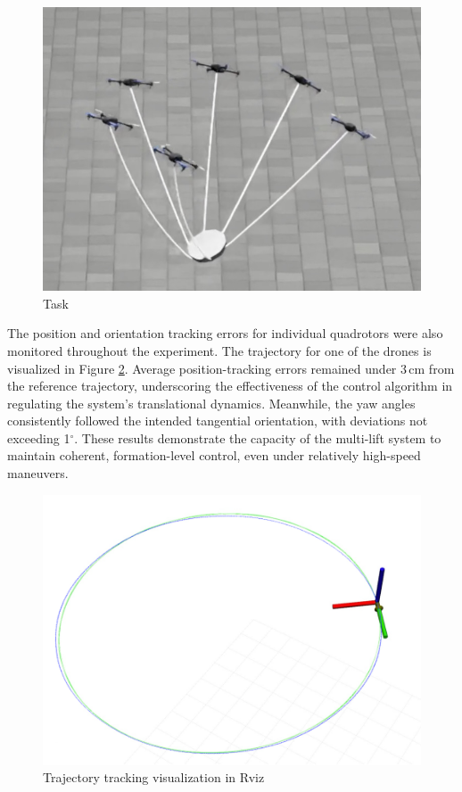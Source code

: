 \documentclass[12pt,twoside,letterpaper]{article}
\begin{document}
\begin{figure}[H]
\begin{minipage}{0.32\textwidth}
        \includegraphics[width=\linewidth]{figures/spin.jpg}
        \caption{Task}
        \label{fig:task}
    \end{minipage}
\end{figure}

The position and orientation tracking errors for individual quadrotors were also monitored throughout the experiment. The trajectory for one of the drones is visualized in Figure \ref{fig:track}. Average position-tracking errors remained under 3\,cm from the reference trajectory, underscoring the effectiveness of the control algorithm in regulating the system’s translational dynamics. Meanwhile, the yaw angles consistently followed the intended tangential orientation, with deviations not exceeding 1\(^\circ\). These results demonstrate the capacity of the multi-lift system to maintain coherent, formation-level control, even under relatively high-speed maneuvers.

\begin{figure}[H]
    \centering
    \begin{minipage}{\textwidth}
        \centering
        \includegraphics[width=0.45\linewidth]{figures/track.jpg}
        \caption{Trajectory tracking visualization in Rviz}
        \label{fig:track}
    \end{minipage}
\end{figure}
\end{document}
